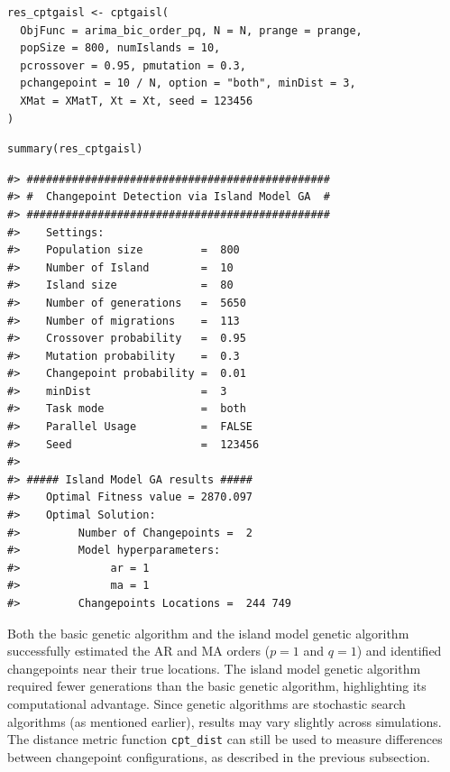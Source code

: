 \begin{verbatim}
res_cptgaisl <- cptgaisl(
  ObjFunc = arima_bic_order_pq, N = N, prange = prange,
  popSize = 800, numIslands = 10,
  pcrossover = 0.95, pmutation = 0.3,
  pchangepoint = 10 / N, option = "both", minDist = 3,
  XMat = XMatT, Xt = Xt, seed = 123456
)
\end{verbatim}

\begin{verbatim}
summary(res_cptgaisl)
\end{verbatim}

\begin{verbatim}
#> ###############################################
#> #  Changepoint Detection via Island Model GA  #
#> ###############################################
#>    Settings: 
#>    Population size         =  800 
#>    Number of Island        =  10 
#>    Island size             =  80 
#>    Number of generations   =  5650 
#>    Number of migrations    =  113 
#>    Crossover probability   =  0.95 
#>    Mutation probability    =  0.3 
#>    Changepoint probability =  0.01 
#>    minDist                 =  3 
#>    Task mode               =  both 
#>    Parallel Usage          =  FALSE 
#>    Seed                    =  123456 
#> 
#> ##### Island Model GA results ##### 
#>    Optimal Fitness value = 2870.097 
#>    Optimal Solution: 
#>         Number of Changepoints =  2 
#>         Model hyperparameters:
#>              ar = 1 
#>              ma = 1 
#>         Changepoints Locations =  244 749
\end{verbatim}

Both the basic genetic algorithm and the island model genetic algorithm successfully estimated the AR and MA orders (\(p=1\) and \(q=1\)) and identified changepoints near their true locations. The island model genetic algorithm required fewer generations than the basic genetic algorithm, highlighting its computational advantage. Since genetic algorithms are stochastic search algorithms (as mentioned earlier), results may vary slightly across simulations. The distance metric function \texttt{cpt\_dist} can still be used to measure differences between changepoint configurations, as described in the previous subsection.


